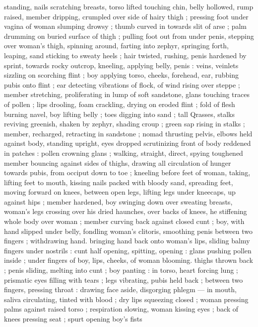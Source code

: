 standing, nails scratching breasts, torso lifted touching chin, belly 
hollowed, rump raised, member dripping, crumpled over side of 
hairy thigh ; pressing foot under vagina of woman slumping drowsy 
; thumb curved in towards slit of arse ; palm drumming on buried 
surface of thigh ; pulling foot out from under penis, stepping over 
woman's thigh, spinning around, farting into zephyr, springing forth, 
leaping, sand sticking to sweaty heels ; hair twisted, rushing, penis 
hardened by sprint, towards rocky outcrop, kneeling, applying belly, 
penis : veins, veinlets sizzling on scorching flint ; boy applying torso, 
cheeks, forehead, ear, rubbing pubis onto flint ; ear detecting 
vibrations of flock, of wind rising over steppe ; member stretching, 
proliferating in lump of soft sandstone, glans touching traces of 
pollen ; lips drooling, foam crackling, drying on eroded flint ; fold of 
flesh burning navel, boy lifting belly ; toes digging into sand ; tall 
Qrasses, stalks reviving greenish, shaken by zephyr, shading croup ; 
green sap rising in stalks ; member, recharged, retracting in 
sandstone ; nomad thrusting pelvis, elbows held against body, 
standing upright, eyes dropped scrutinizing front of body reddened 
in patches : pollen crowning glans ; walking, straight, direct, spying 
toughened member bouncing against sides of thighs, drawing all 
circulation of hunger towards pubis, from occiput down to toe ; 
kneeling before feet of woman, taking, lifting feet to mouth, kissing 
nails packed with bloody sand, spreading feet, moving forward on 
knees, between open legs, lifting legs under kneecaps, up against 
hips ; member hardened, boy swinging down over sweating breasts, 
woman's legs crossing over his dried haunches, over backs of knees, 
he stiffening whole body over woman ; member curving back against 
closed cunt ; boy, with hand slipped under belly, fondling woman's 
clitoris, smoothing penis between two fingers ; withdrawing hand. 
bringing hand back onto woman's lips, sliding balmy fingers under 
nostrils : cunt half opening, spitting, opening : glans pushing pollen 
inside ; under fingers of boy, lips, cheeks, of woman blooming. 
thighs thrown back ; penis sliding, melting into cunt ; boy panting : 
in torso, heart forcing lung ; prismatic eyes filling with tears ; legs 
vibrating, pubis held back ; between two fingers, pressing throat : 
drawing face aside, disgorging phlegm --- in mouth, saliva 
circulating, tinted with blood ; dry lips squeezing closed ; woman 
pressing palms against raised torso ; respiration slowing, woman 
kissing eyes ; back of knees pressing seat ; spurt opening boy's fists 
